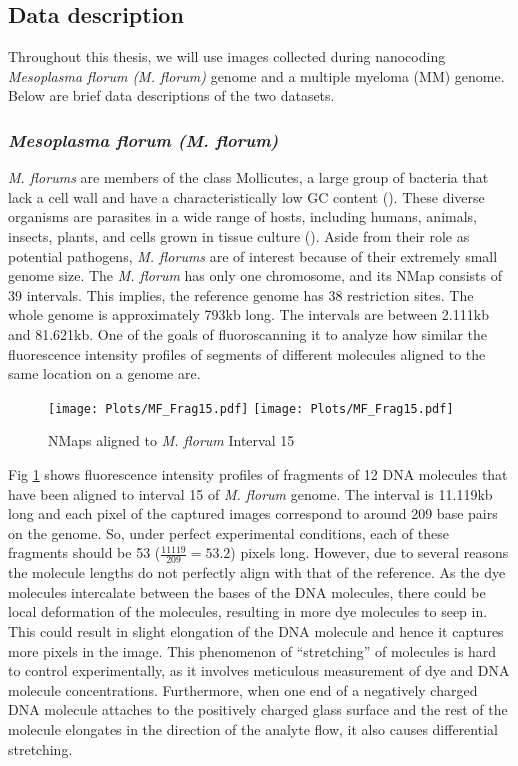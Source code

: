 \subsection{Data description} \label{Ch2_data}
Throughout this thesis, we will use images collected during nanocoding {\emph{Mesoplasma florum (M. florum)}} genome and a multiple myeloma (MM) genome. Below are brief data descriptions of the two datasets.
\subsubsection{\emph{Mesoplasma florum (M. florum)}}
{\emph{M. florums}} are members of the class Mollicutes, a large group of bacteria that lack a cell wall and have a characteristically low GC content (\cite{Razin_etal_1998_MMBR}). These diverse organisms are parasites in a wide range of hosts, including humans, animals, insects, plants, and cells grown in tissue culture (\cite{Razin_etal_1998_MMBR}). Aside from their role as potential pathogens, {\emph{M. florums}} are of interest because of their extremely small genome size. The {\emph{M. florum}} has only one chromosome, and its NMap consists of 39 intervals. This implies, the reference genome has 38 restriction sites. The whole genome is approximately 793kb long. The intervals are between 2.111kb and 81.621kb. One of the goals of fluoroscanning it to analyze how similar the fluorescence intensity profiles of segments of different molecules aligned to the same location on a genome are. 
\begin{figure}[H]
\begin{center}
\texttt{[image: Plots/MF\_Frag15.pdf]}
\texttt{[image: Plots/MF\_Frag15.pdf]}
\end{center}
\caption{NMaps aligned to {\emph{M. florum}} Interval 15}
\label{fig:Fig2_MF_Frag15}
\end{figure}

Fig \ref{fig:Fig2_MF_Frag15} shows fluorescence intensity profiles of fragments of 12 DNA molecules that have been aligned to interval 15 of {\emph{M. florum}} genome. The interval is 11.119kb long and each pixel of the captured images correspond to around 209 base pairs on the genome. So, under perfect experimental conditions, each of these fragments should be 53 ($\frac{11119}{209} = 53.2$) pixels long. However, due to several reasons the molecule lengths do not perfectly align with that of the reference. As the dye molecules intercalate between the bases of the DNA molecules, there could be local deformation of the molecules, resulting in more dye molecules to seep in. This could result in slight elongation of the DNA molecule and hence it captures more pixels in the image. This phenomenon of ``stretching'' of molecules is hard to control experimentally, as it involves meticulous measurement of dye and DNA molecule concentrations. Furthermore, when one end of a negatively charged DNA molecule attaches to the positively charged glass surface and the rest of the molecule elongates in the direction of the analyte flow, it also causes differential stretching. 

